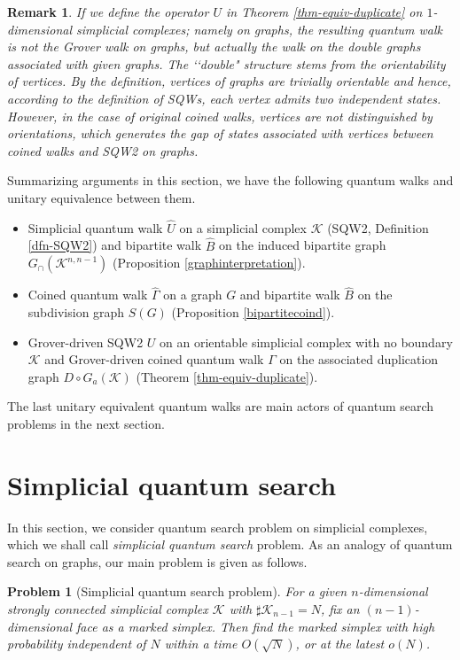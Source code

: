 \documentclass[a4paper,12pt]{article}
\newtheorem{remark}[definition]{Remark}
\newtheorem{problem}[definition]{Problem}
\numberwithin{equation}{section}
\begin{document}
\begin{remark}\rm
\label{rem-dim1}
If we define the operator $U$ in Theorem \ref{thm-equiv-duplicate} on $1$-dimensional simplicial complexes; namely on graphs, the resulting quantum walk is not the Grover walk on graphs, but actually the walk on the {\em double graphs} associated with given graphs.
The \lq\lq double" structure stems from the orientability of vertices.
By the definition, vertices of graphs are trivially orientable and hence, according to the definition of SQWs, each vertex admits two independent states.
However, in the case of original coined walks, vertices are not distinguished by orientations, which generates the gap of states associated with vertices between coined walks and SQW2 on graphs.
\end{remark}

Summarizing arguments in this section, we have the following quantum walks and unitary equivalence between them.
\begin{itemize}
\item Simplicial quantum walk $\hat U$ on a simplicial complex $\mathcal{K}$ (SQW2, Definition \ref{dfn-SQW2}) and bipartite walk $\hat B$ on the induced bipartite graph $G_\cap(\mathcal{K}^{n,n-1})$ (Proposition \ref{graphinterpretation}).
\item Coined quantum walk $\hat \Gamma$ on a graph $G$ and bipartite walk $\hat B$ on the subdivision graph $S(G)$ (Proposition \ref{bipartitecoind}).
\item Grover-driven SQW2 $U$ on an orientable simplicial complex with no boundary $\mathcal{K}$ and Grover-driven coined quantum walk $\Gamma$ on the associated duplication graph $D\circ G_a(\mathcal{K})$ (Theorem \ref{thm-equiv-duplicate}).
\end{itemize}
The last unitary equivalent quantum walks are main actors of quantum search problems in the next section.




%
%
\section{Simplicial quantum search}
\label{section-search}
In this section, we consider quantum search problem on simplicial complexes, which we shall call {\em simplicial quantum search} problem.
As an analogy of quantum search on graphs, our main problem is given as follows.
\begin{problem}[Simplicial quantum search problem]
\label{prob-search}
For a given $n$-dimensional strongly connected simplicial complex $\mathcal{K}$ with $\sharp \mathcal{K}_{n-1} = N$, fix an $(n-1)$-dimensional face as {\em a marked simplex}.
Then find the marked simplex with high probability independent of $N$ within a time $O(\sqrt{N})$, or at the latest $o(N)$.
\end{problem}
\end{document}
